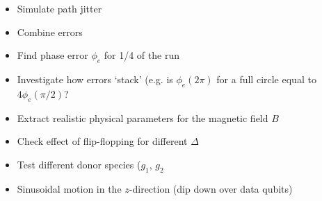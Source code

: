 \begin{itemize}
\item Simulate path jitter
\item Combine errors
\item Find phase error $\phi_e$ for 1/4 of the run
\item Investigate how errors `stack' (e.g. is $\phi_e(2\pi)$ for a full circle equal to $4\phi_e(\pi/2)$?
\item Extract realistic physical parameters for the magnetic field $B$
\item Check effect of flip-flopping for different $\Delta$
\item Test different donor species ($g_1$, $g_2$
\item Sinusoidal motion in the $z$-direction (dip down over data qubits)
\end{itemize}







